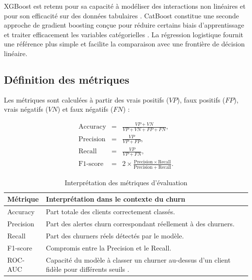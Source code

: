 \documentclass[12pt, a4paper]{article}
\begin{document}
XGBoost est retenu pour sa capacité à modéliser des interactions non linéaires
et pour son efficacité sur des données tabulaires \cite{chen2016xgboost}.
CatBoost constitue une seconde approche de gradient boosting conçue pour
réduire certains biais d'apprentissage et traiter efficacement les variables
catégorielles \cite{prokhorenkova2018catboost}. La régression logistique fournit
une référence plus simple et facilite la comparaison avec une frontière de
décision linéaire.

\subsection{Définition des métriques}

Les métriques sont calculées à partir des vrais positifs ($VP$), faux positifs
($FP$), vrais négatifs ($VN$) et faux négatifs ($FN$) :

\[
\begin{array}{rcl}
\mathrm{Accuracy} &=& \displaystyle\frac{VP + VN}{VP + VN + FP + FN},\\[0.35cm]
\mathrm{Precision} &=& \displaystyle\frac{VP}{VP + FP},\\[0.35cm]
\mathrm{Recall} &=& \displaystyle\frac{VP}{VP + FN},\\[0.35cm]
\mathrm{F1\mbox{-}score} &=& \displaystyle 2 \times
\frac{\mathrm{Precision}\times\mathrm{Recall}}
{\mathrm{Precision}+\mathrm{Recall}}.
\end{array}
\]

\begin{table}[H]
\centering
\caption{Interprétation des métriques d'évaluation}
\begin{tabularx}{\textwidth}{p{}X}
\toprule
\textbf{Métrique} & \textbf{Interprétation dans le contexte du churn}\\
\midrule
Accuracy & Part totale des clients correctement classés.\\
Precision & Part des alertes churn correspondant réellement à des churners.\\
Recall & Part des churners réels détectés par le modèle.\\
F1-score & Compromis entre la Precision et le Recall.\\
ROC-AUC & Capacité du modèle à classer un churner au-dessus d'un client fidèle
pour différents seuils \cite{fawcett2006roc}.\\
\bottomrule
\end{tabularx}
\end{table}
\end{document}
